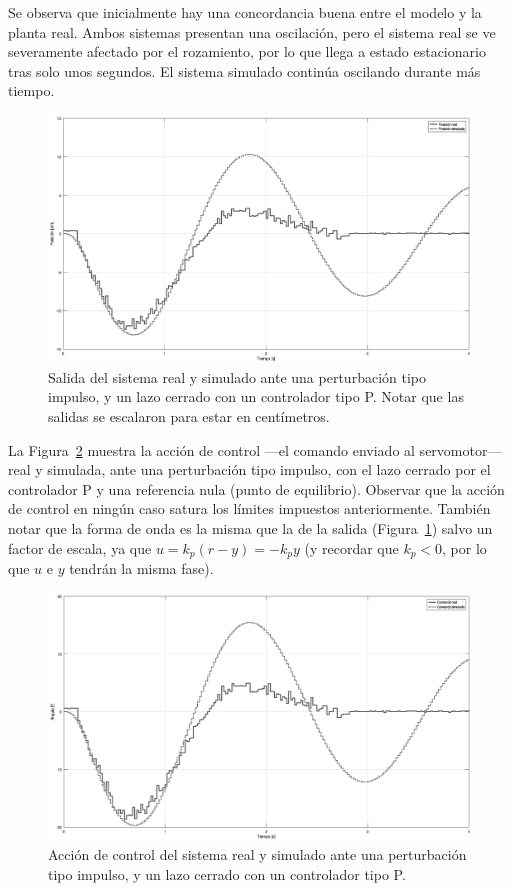 Se observa que inicialmente hay una concordancia buena entre el modelo y la planta real. Ambos sistemas presentan una oscilación, pero el sistema real se ve severamente afectado por el rozamiento, por lo que llega a estado estacionario tras solo unos segundos. El sistema simulado continúa oscilando durante más tiempo.

\begin{figure}[!tbp]
    \centering
    \includegraphics[width=\linewidth]{img/p-pert-salida.eps}
    \caption{Salida del sistema real y simulado ante una perturbación tipo impulso, y un lazo cerrado con un controlador tipo P. Notar que las salidas se escalaron para estar en centímetros.}
    \label{fig:p-pert-salida}
\end{figure}

La Figura~\ref{fig:p-pert-cont} muestra la acción de control ---el comando enviado al servomotor--- real y simulada, ante una perturbación tipo impulso, con el lazo cerrado por el controlador P y una referencia nula (punto de equilibrio). Observar que la acción de control en ningún caso satura los límites impuestos anteriormente. También notar que la forma de onda es la misma que la de la salida (Figura~\ref{fig:p-pert-salida}) salvo un factor de escala, ya que $u = k_p (r - y) = -k_p y$ (y recordar que $k_p < 0$, por lo que $u$ e $y$ tendrán la misma fase).

\begin{figure}[!tbp]
    \centering
    \includegraphics[width=\linewidth]{img/p-pert-cont.eps}
    \caption{Acción de control del sistema real y simulado ante una perturbación tipo impulso, y un lazo cerrado con un controlador tipo P.}
    \label{fig:p-pert-cont}
\end{figure}

